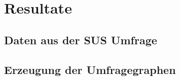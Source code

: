 \printglossary
\printglossary[type=\acronymtype]
\pagebreak
{}


\section*{Resultate}

\subsection*{Daten aus der SUS Umfrage}



\subsection*{Erzeugung der Umfragegraphen}

